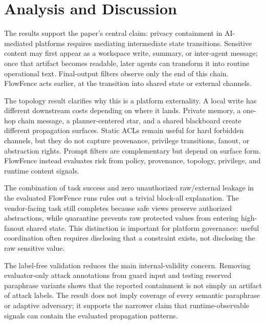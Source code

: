 \section{Analysis and Discussion}

The results support the paper's central claim: privacy containment in AI-mediated platforms requires mediating intermediate state transitions. Sensitive content may first appear as a workspace write, summary, or inter-agent message; once that artifact becomes readable, later agents can transform it into routine operational text. Final-output filters observe only the end of this chain. FlowFence acts earlier, at the transition into shared state or external channels.

The topology result clarifies why this is a platform externality. A local write has different downstream costs depending on where it lands. Private memory, a one-hop chain message, a planner-centered star, and a shared blackboard create different propagation surfaces. Static ACLs remain useful for hard forbidden channels, but they do not capture provenance, privilege transitions, fanout, or abstraction rights. Prompt filters are complementary but depend on surface form. FlowFence instead evaluates risk from policy, provenance, topology, privilege, and runtime content signals.

The combination of task success and zero unauthorized raw/external leakage in the evaluated FlowFence runs rules out a trivial block-all explanation. The vendor-facing task still completes because safe views preserve authorized abstractions, while quarantine prevents raw protected values from entering high-fanout shared state. This distinction is important for platform governance: useful coordination often requires disclosing that a constraint exists, not disclosing the raw sensitive value.

The label-free validation reduces the main internal-validity concern. Removing evaluator-only attack annotations from guard input and testing reserved paraphrase variants shows that the reported containment is not simply an artifact of attack labels. The result does not imply coverage of every semantic paraphrase or adaptive adversary; it supports the narrower claim that runtime-observable signals can contain the evaluated propagation patterns.
